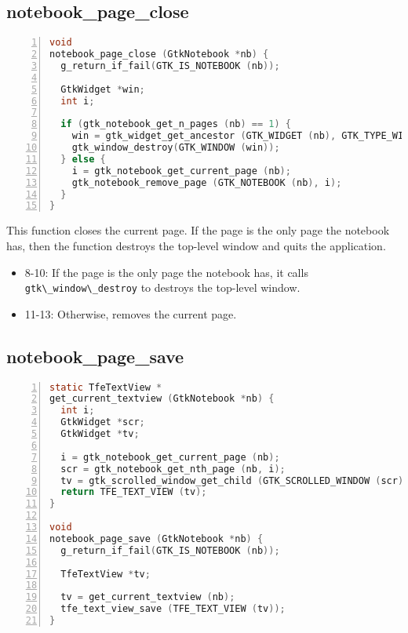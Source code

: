 \hypertarget{notebook_page_close}{%
\subsection{notebook\_page\_close}\label{notebook_page_close}}

\begin{lstlisting}[language=C, numbers=left]
void
notebook_page_close (GtkNotebook *nb) {
  g_return_if_fail(GTK_IS_NOTEBOOK (nb));

  GtkWidget *win;
  int i;

  if (gtk_notebook_get_n_pages (nb) == 1) {
    win = gtk_widget_get_ancestor (GTK_WIDGET (nb), GTK_TYPE_WINDOW);
    gtk_window_destroy(GTK_WINDOW (win));
  } else {
    i = gtk_notebook_get_current_page (nb);
    gtk_notebook_remove_page (GTK_NOTEBOOK (nb), i);
  }
}
\end{lstlisting}

This function closes the current page. If the page is the only page the
notebook has, then the function destroys the top-level window and quits
the application.

\begin{itemize}
\tightlist
\item
  8-10: If the page is the only page the notebook has, it calls
  \passthrough{\lstinline!gtk\_window\_destroy!} to destroys the
  top-level window.
\item
  11-13: Otherwise, removes the current page.
\end{itemize}

\hypertarget{notebook_page_save}{%
\subsection{notebook\_page\_save}\label{notebook_page_save}}

\begin{lstlisting}[language=C, numbers=left]
static TfeTextView *
get_current_textview (GtkNotebook *nb) {
  int i;
  GtkWidget *scr;
  GtkWidget *tv;

  i = gtk_notebook_get_current_page (nb);
  scr = gtk_notebook_get_nth_page (nb, i);
  tv = gtk_scrolled_window_get_child (GTK_SCROLLED_WINDOW (scr));
  return TFE_TEXT_VIEW (tv);
}

void
notebook_page_save (GtkNotebook *nb) {
  g_return_if_fail(GTK_IS_NOTEBOOK (nb));

  TfeTextView *tv;

  tv = get_current_textview (nb);
  tfe_text_view_save (TFE_TEXT_VIEW (tv));
}
\end{lstlisting}

